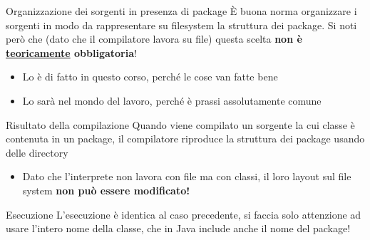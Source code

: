 \documentclass[xcolor=dvipsnames,presentation]{beamer}
\begin{document}
\begin{frame}{Organizzazione dei sorgenti in presenza di package}
        È buona norma organizzare i sorgenti in modo da rappresentare su filesystem la struttura
dei package. Si noti però che (dato che il compilatore lavora su \alert{file}) questa scelta
\textbf{non è \underline{teoricamente} obbligatoria}!
    \begin{itemize}
        \item Lo è di fatto in questo corso, perché le cose van fatte bene
        \item Lo sarà nel mondo del lavoro, perché è prassi assolutamente comune
    \end{itemize}
    \begin{block}{Risultato della compilazione}
        Quando viene compilato un sorgente la cui classe è contenuta in un package, il compilatore
riproduce la struttura dei package usando delle directory
        \begin{itemize}
            \item Dato che l'interprete non lavora con file ma con \alert{classi}, il loro layout
sul file system \textbf{non può essere modificato!}
        \end{itemize}
    \end{block}
    \begin{block}{Esecuzione}
        L'esecuzione è identica al caso precedente, si faccia solo attenzione ad
usare l'intero nome della classe, che in Java include anche il nome del package!
    \end{block}
\end{frame}
\end{document}
